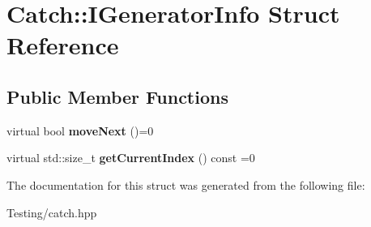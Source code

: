 \hypertarget{struct_catch_1_1_i_generator_info}{\section{Catch\-:\-:I\-Generator\-Info Struct Reference}
\label{struct_catch_1_1_i_generator_info}
}
\subsection*{Public Member Functions}
\begin{DoxyCompactItemize}
\item 
\hypertarget{struct_catch_1_1_i_generator_info_a2b86711ca7009903edfe27ed62b515ef}{virtual bool {\bfseries move\-Next} ()=0}\label{struct_catch_1_1_i_generator_info_a2b86711ca7009903edfe27ed62b515ef}

\item 
\hypertarget{struct_catch_1_1_i_generator_info_a6a0dca712d31f6849fd9447b1344673a}{virtual std\-::size\-\_\-t {\bfseries get\-Current\-Index} () const =0}\label{struct_catch_1_1_i_generator_info_a6a0dca712d31f6849fd9447b1344673a}

\end{DoxyCompactItemize}


The documentation for this struct was generated from the following file\-:\begin{DoxyCompactItemize}
\item 
Testing/catch.\-hpp\end{DoxyCompactItemize}
